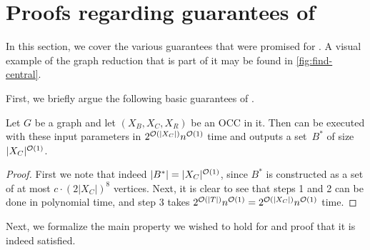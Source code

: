 \section{Proofs regarding guarantees of }
In this section, we cover the various guarantees that were promised for . A visual example of the graph reduction that is part of it may be found in \cref{fig:find-central}.



First, we briefly argue the following basic guarantees of .

\begin{lemma} \label{lem:mark:running:time}
	Let $G$ be a graph and let $(X_B, X_C, X_R)$ be an OCC in it. Then  can be executed with these input parameters in $2^{\mathcal{O}(|X_C|)} n^{\mathcal{O}(1)}$ time and outputs a set~$B^\ast$ of size $|X_C|^{\mathcal{O}(1)}$.
\end{lemma}
\begin{proof}
	First we note that indeed $|B^\ast| = |X_C|^{\mathcal{O}(1)}$, since $B^\ast$ is constructed as a set of at most $c \cdot (2|X_C|)^8$ vertices. Next, it is clear to see that steps 1 and 2 can be done in polynomial time, and step 3 takes
	$2^{\mathcal{O}(|T|)} n^{\mathcal{O}(1)} = 2^{\mathcal{O}(|X_C|)} n^{\mathcal{O}(1)}$ time.
\end{proof}

Next, we formalize the main property we wished to hold for  and proof that it is indeed satisfied.


